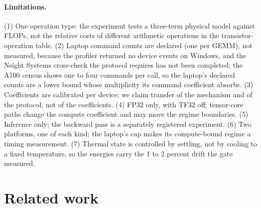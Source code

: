 \documentclass{article}
\begin{document}
\paragraph{Limitations.} (1) One operation type: the experiment tests a three-term physical model against FLOPs, not the relative costs of different arithmetic operations in the transistor-operation table. (2) Laptop command counts are declared (one per GEMM), not measured, because the profiler returned no device events on Windows, and the Nsight Systems cross-check the protocol requires has not been completed; the A100 census shows one to four commands per call, so the laptop's declared counts are a lower bound whose multiplicity its command coefficient absorbs. (3) Coefficients are calibrated per device; we claim transfer of the mechanism and of the protocol, not of the coefficients. (4) FP32 only, with TF32 off; tensor-core paths change the compute coefficient and may move the regime boundaries. (5) Inference only; the backward pass is a separately registered experiment. (6) Two platforms, one of each kind; the laptop's cap makes its compute-bound regime a timing measurement. (7) Thermal state is controlled by settling, not by cooling to a fixed temperature, so the energies carry the 1 to 2 percent drift the gate measured.

\section{Related work}
\label{sec:related}
\end{document}
